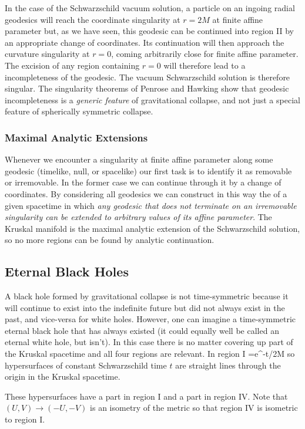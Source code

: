 In the case of the Schwarzschild vacuum solution, a particle on an ingoing radial
geodesics will reach the coordinate singularity at $r=2M$ at finite affine
parameter but, as we have seen, this geodesic can be continued into region II
by an appropriate change of coordinates. Its continuation will then approach the
curvature singularity at $r=0$, coming arbitrarily close for finite affine
parameter. The excision of any region containing $r=0$ will therefore lead to a
incompleteness of the geodesic. The vacuum Schwarzschild solution is therefore
singular. The singularity theorems of Penrose and Hawking show that geodesic
incompleteness is a \emph{generic feature} of gravitational collapse, and not
just a special feature of spherically symmetric collapse.

\subsubsection{Maximal Analytic Extensions}

Whenever we encounter a singularity at finite affine parameter along some
geodesic (timelike, null, or spacelike) our first task is to identify it as
removable or irremovable. In the former case we can continue through it by a
change of coordinates.  By considering all geodesics we can construct in
this way the  of a given spacetime in which
\emph{any geodesic that does not terminate on an irremovable singularity can be
extended to arbitrary values of its affine parameter}. The Kruskal manifold
is the maximal analytic extension of the Schwarzschild solution, so no more
regions can be found by analytic continuation.

\subsection{Eternal Black Holes}

A black hole formed by gravitational collapse is not time-symmetric because it 
will continue to exist into the indefinite future but did not always exist in
the past, and vice-versa for white holes.  However, one can imagine a
time-symmetric eternal black hole that has always existed (it could equally well
be called an eternal white hole, but isn't).  In this case there is no matter
covering up part of the Kruskal spacetime and all four regions are relevant.  
In region I
\be
{}=e^{-t/2M}
\ee
so hypersurfaces of constant Schwarzschild time $t$ are straight lines through 
the origin in the Kruskal spacetime.
\begin{center}\end{center}
These hypersurfaces have a part in region I and a part in region IV.  Note that 
$(U,V)\to (-U,-V)$ is an isometry of the metric so that region IV is isometric
to region I. \\

